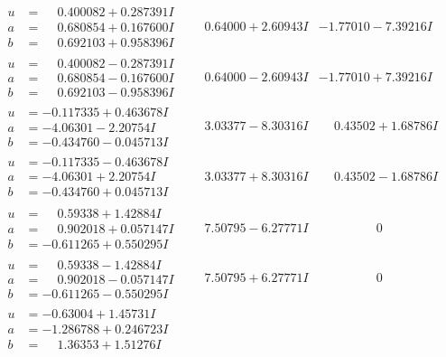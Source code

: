 \documentclass[1p]{elsarticle_modified}
\theoremstyle{definition}
\begin{document}
$$\begin{array}{c|c|c}
\begin{aligned}
u &= \phantom{-}0.400082 + 0.287391 I \\
a &= \phantom{-}0.680854 + 0.167600 I \\
b &= \phantom{-}0.692103 + 0.958396 I\end{aligned}
 & \phantom{-}0.64000 + 2.60943 I & -1.77010 - 7.39216 I \\ \hline\begin{aligned}
u &= \phantom{-}0.400082 - 0.287391 I \\
a &= \phantom{-}0.680854 - 0.167600 I \\
b &= \phantom{-}0.692103 - 0.958396 I\end{aligned}
 & \phantom{-}0.64000 - 2.60943 I & -1.77010 + 7.39216 I \\ \hline\begin{aligned}
u &= -0.117335 + 0.463678 I \\
a &= -4.06301 - 2.20754 I \\
b &= -0.434760 - 0.045713 I\end{aligned}
 & \phantom{-}3.03377 - 8.30316 I & \phantom{-}0.43502 + 1.68786 I \\ \hline\begin{aligned}
u &= -0.117335 - 0.463678 I \\
a &= -4.06301 + 2.20754 I \\
b &= -0.434760 + 0.045713 I\end{aligned}
 & \phantom{-}3.03377 + 8.30316 I & \phantom{-}0.43502 - 1.68786 I \\ \hline\begin{aligned}
u &= \phantom{-}0.59338 + 1.42884 I \\
a &= \phantom{-}0.902018 + 0.057147 I \\
b &= -0.611265 + 0.550295 I\end{aligned}
 & \phantom{-}7.50795 - 6.27771 I & \phantom{-0.000000 } 0 \\ \hline\begin{aligned}
u &= \phantom{-}0.59338 - 1.42884 I \\
a &= \phantom{-}0.902018 - 0.057147 I \\
b &= -0.611265 - 0.550295 I\end{aligned}
 & \phantom{-}7.50795 + 6.27771 I & \phantom{-0.000000 } 0 \\ \hline\begin{aligned}
u &= -0.63004 + 1.45731 I \\
a &= -1.286788 + 0.246723 I \\
b &= \phantom{-}1.36353 + 1.51276 I\end{aligned}

\end{array}$$
\end{document}
